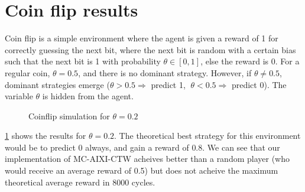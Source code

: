 \documentclass[pdftex,twoside,a4paper]{report}
\newcommand{\mac}{MC-AIXI-CTW}
\begin{document}
\section{Coin flip results}
Coin flip is a simple environment where the agent is given a reward of 1 for correctly guessing the next bit, where the next bit is random with a certain bias such that the next bit is 1 with probability $\theta \in [0,1]$, else the reward is 0. For a regular coin, $\theta = 0.5$, and there is no dominant strategy. However, if $\theta \not = 0.5$, dominant strategies emerge ($\theta > 0.5 \Rightarrow $ predict 1, $\; \theta < 0.5 \Rightarrow $ predict 0). The variable $\theta$ is hidden from the agent.
\begin{figure}
\centering
\caption{Coinflip simulation for $\theta=0.2$}
\label{fig:coin_0_2}
\end{figure}
	
\ref{fig:coin_0_2} shows the results for $\theta=0.2$. The theoretical best strategy for this environment would be to predict $0$ always, and gain a reward of $0.8$. We can see that our implementation of \mac{} acheives better than a random player (who would receive an average reward of 0.5) but does not acheive the maximum theoretical average reward in 8000 cycles.
 
\end{document}
